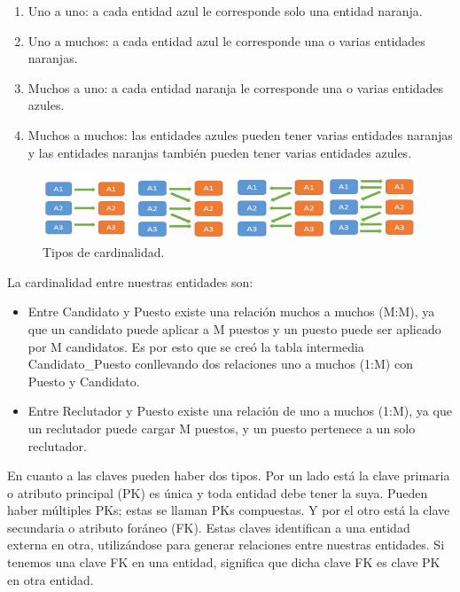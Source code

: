 \documentclass[12pt,a4paper]{article}
\begin{document}
\begin{sloppypar}
\begin{itemize}
\begin{enumerate}
\item Uno a uno: a cada entidad azul le corresponde solo una entidad naranja.
\item Uno a muchos: a cada entidad azul le corresponde una o varias entidades naranjas.
\item Muchos a uno: a cada entidad naranja le corresponde una o varias entidades azules.
\item Muchos a muchos: las entidades azules pueden tener varias entidades naranjas y las entidades naranjas también pueden tener varias entidades azules.
\end{enumerate}
\end{itemize}

\begin{figure}[H]    %
  \centering
  \includegraphics[width=1\textwidth]{images/Cardinalidad.png}
  \caption{Tipos de cardinalidad.}  
  \label{fig:Cardinalidad}
\end{figure}

La cardinalidad entre nuestras entidades son:
\begin{itemize}
\item Entre Candidato y Puesto existe una relación muchos a muchos (M:M), ya que un candidato puede aplicar a M puestos y un puesto puede ser aplicado por M candidatos. Es por esto que se creó la tabla intermedia Candidato\_Puesto conllevando dos relaciones uno a muchos (1:M) con Puesto y Candidato.
\item Entre Reclutador y Puesto existe una relación de uno a muchos (1:M), ya que un reclutador puede cargar M puestos, y un puesto pertenece a un solo reclutador.
\end{itemize}

En cuanto a las claves pueden haber dos tipos. Por un lado está la clave primaria o atributo principal (PK)  es única y toda entidad debe tener la suya. Pueden haber múltiples PKs; estas se llaman PKs compuestas. Y por el otro está la clave secundaria o atributo foráneo (FK). Estas claves identifican a una entidad externa en otra, utilizándose para generar relaciones entre nuestras entidades. Si tenemos una clave FK en una entidad, significa que dicha clave FK es clave PK en otra entidad.



\end{sloppypar}
\end{document}

